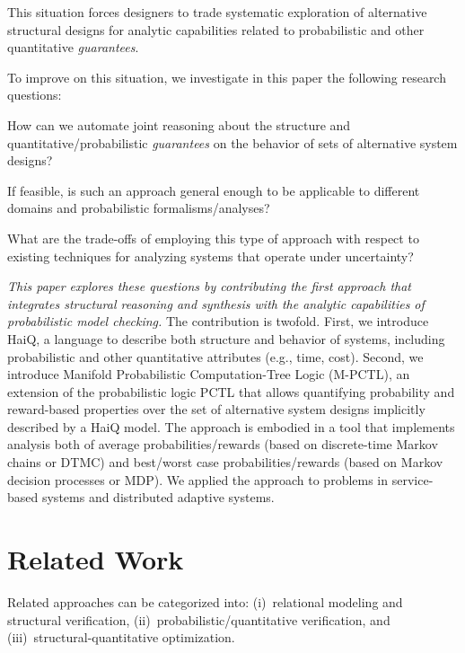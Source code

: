 \documentclass[10pt,journal,compsoc]{IEEEtran}
\begin{document}
 This situation forces designers to trade systematic exploration of alternative structural designs for analytic capabilities related to probabilistic and other quantitative {\em guarantees}.


To improve on this situation, we investigate in this paper the following research questions:

 How can we automate joint reasoning about the structure and quantitative/probabilistic {\em guarantees} on the behavior of sets of alternative system designs?

 If feasible, is such an approach general enough to be applicable to different domains and probabilistic formalisms/analyses?

 What are the trade-offs of employing this type of approach with respect to existing techniques for analyzing systems that operate under uncertainty?


{\it This paper explores these questions by contributing the first approach that integrates structural reasoning and synthesis with the analytic capabilities of probabilistic model checking.} 
The contribution is twofold. 
First, we introduce {\sf HaiQ}, a language to describe both structure and behavior of systems, including probabilistic and other quantitative attributes (e.g., time, cost).
Second, we introduce Manifold Probabilistic Computation-Tree Logic (M-PCTL), an extension of the probabilistic logic PCTL that allows quantifying probability and reward-based properties over the set of alternative system designs implicitly described by a {\sf HaiQ} model. 
The approach is embodied in a tool that implements analysis both of average probabilities/rewards (based on discrete-time Markov chains or DTMC) and best/worst case probabilities/rewards (based on Markov decision processes or MDP). We applied the approach to problems in service-based systems and distributed adaptive systems.

\section{Related Work}
\label{sec:related}
Related approaches can be categorized into: (i)~relational modeling and structural verification, (ii)~probabilistic/quantitative verification, and (iii)~structural-quantitative optimization.%
\end{document}
